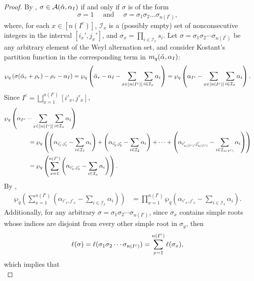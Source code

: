 \documentclass[10pt,a4paper]{amsart}
\newcommand{\hr}[0]{\Tilde{\alpha}}
\newcommand{\newmu}[0]{\alpha_I}
\newcommand{\qpartition}[1]{\wp_q\left(#1\right)}
\newcommand{\thealtset}[0]{\mathcal{A}(\hr,\newmu)}
\begin{document}
\begin{proof}
    By , $\sigma\in\thealtset$ if and only if $\sigma$ is of the form
    \[\sigma=1 \quad \text{ and } \quad \sigma= \sigma_1\sigma_2\ldots\sigma_{n(I^c)},\]
    where, for each $x\in [n(I^c)]$, $\mathcal{I}_x$ is a (possibly empty) set of nonconsecutive integers in the interval $[i_x',j_x']$, and $\sigma_x=\prod_{i\in\mathcal{I}_x}s_i$. 
    Let $\sigma=\sigma_1\sigma_2\cdots\sigma_{n(I^c)}$ be any arbitrary element of the Weyl alternation set, and consider Kostant's partition function in the corresponding term in $m_q(\hr,\alpha_I)$:
    \begin{equation}
        \qpartition{\sigma(\hr_r+\rho_r)-\rho_r-\alpha_I} = \qpartition{\hr_r - \alpha_{I}-\sum_{x\in[n(I^c)]}\sum_{i\in\mathcal{I}_x}\alpha_i} = \qpartition{\alpha_{I^c}-\sum_{x\in[n(I^c)]}\sum_{i\in\mathcal{I}_x}\alpha_i}.\notag
    \end{equation}
    Since $I^c = \bigsqcup_{x=1}^{n(I^c)}[i'_x,j'_x]$, 
    \begin{align}
        &\qpartition{\alpha_{I^c}-\sum_{x\in[n(I^c)]}\sum_{i\in\mathcal{I}_x}\alpha_i}\notag\\
        &\qquad \qquad = \qpartition{\left(\alpha_{i'_1,j'_1}-\sum_{i\in\mathcal{I}_1}\alpha_i\right)+\left(\alpha_{i'_2,j'_2}-\sum_{i\in\mathcal{I}_2}\alpha_i\right)+\cdots+\left(\alpha_{i'_{n(I^c)},j'_{n(I^c)}}-\sum_{i\in\mathcal{I}_{n(I^c)}}\alpha_i\right)}\notag \\
        &\qquad\qquad = \qpartition{\sum_{x=1}^{n(I^c)}\left(\alpha_{i'_x,j'_x}-\sum_{i\in\mathcal{I}_x}\alpha_i\right)}.\notag
    \end{align}
    By ,
    \begin{align}
        \qpartition{\sum_{x=1}^{n(I^c)}\left(\alpha_{i'_x,j'_x}-\sum_{i\in\mathcal{I}_x}\alpha_i\right)}
        &=\prod_{x=1}^{n(I^c)}\qpartition{\alpha_{i'_x,j'_x}-\sum_{i\in\mathcal{I}_x}\alpha_i}.\label{break into product 1}
    \end{align}
    Additionally, for any arbitrary $\sigma=\sigma_1\sigma_2\cdots\sigma_{n(I^c)}$, since $\sigma_x$ contains simple roots whose indices are disjoint from every other simple root in $\sigma_y$, then
    \begin{equation}
        \ell(\sigma) = \ell(\sigma_1\sigma_2\cdots \sigma_{n(I^c)}) = \sum_{x=1}^{n(I^c)} \ell(\sigma_x),\notag
    \end{equation}
    which implies that
    \begin{equation}

\end{equation}
\end{proof}
\end{document}
